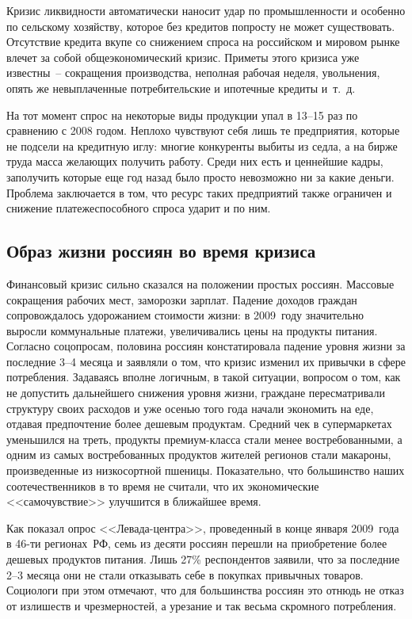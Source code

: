   Кризис ликвидности автоматически наносит удар по промышленности и особенно по
  сельскому хозяйству, которое без кредитов попросту не может существовать.
  Отсутствие кредита вкупе со снижением спроса на российском и мировом рынке
  влечет за собой общеэкономический кризис. Приметы этого кризиса уже
  известны~-- сокращения производства, неполная рабочая неделя, увольнения,
  опять же невыплаченные потребительские и ипотечные кредиты и~т.~д.

  На тот момент спрос на некоторые виды продукции упал в 13--15 раз по
  сравнению с 2008 годом. Неплохо чувствуют себя лишь те предприятия, которые
  не подсели на кредитную иглу: многие конкуренты выбиты из седла, а на бирже
  труда масса желающих получить работу. Среди них есть и ценнейшие кадры,
  заполучить которые еще год назад было просто невозможно ни за какие деньги.
  Проблема заключается в том, что ресурс таких предприятий также ограничен и
  снижение платежеспособного спроса ударит и по ним.

  \subsection{Образ жизни россиян во время кризиса}

  Финансовый кризис сильно сказался на положении простых россиян. Массовые
  сокращения рабочих мест, заморозки зарплат. Падение доходов граждан
  сопровождалось удорожанием стоимости жизни: в 2009~году значительно выросли
  коммунальные платежи, увеличивались цены на продукты питания. Согласно
  соцопросам, половина россиян констатировала падение уровня жизни за последние
  3--4 месяца и заявляли о том, что кризис изменил их привычки в сфере
  потребления. Задаваясь вполне логичным, в такой ситуации, вопросом о том, как
  не допустить дальнейшего снижения уровня жизни, граждане пересматривали
  структуру своих расходов и уже осенью того года начали экономить на еде,
  отдавая предпочтение более дешевым продуктам. Средний чек в супермаркетах
  уменьшился на треть, продукты премиум-класса стали менее востребованными, а
  одним из самых востребованных продуктов жителей регионов стали макароны,
  произведенные из низкосортной пшеницы. Показательно, что большинство наших
  соотечественников в то время не считали, что их экономические
  <<самочувствие>> улучшится в ближайшее время.

  Как показал опрос <<Левада-центра>>, проведенный в конце января 2009~года в
  46-ти регионах~РФ, семь из десяти россиян перешли на приобретение более
  дешевых продуктов питания. Лишь 27\% респондентов заявили, что за последние
  2--3 месяца они не стали отказывать себе в покупках привычных товаров.
  Социологи при этом отмечают, что для большинства россиян это отнюдь не отказ
  от излишеств и чрезмерностей, а урезание и так весьма скромного потребления.

